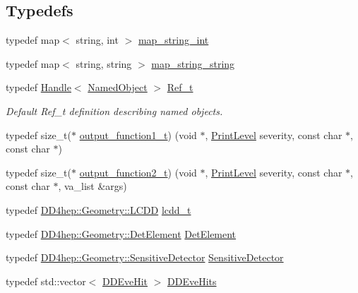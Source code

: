 \subsection*{Typedefs}
\begin{DoxyCompactItemize}
\item 
typedef map$<$ string, int $>$ \hyperlink{namespace_d_d4hep_a5d68f9c863a419d5ed00cc08b473e352}{map\+\_\+string\+\_\+int}
\item 
typedef map$<$ string, string $>$ \hyperlink{namespace_d_d4hep_a0f6ae5793bad82d7e3c5a6fd76334cf1}{map\+\_\+string\+\_\+string}
\item 
typedef \hyperlink{class_d_d4hep_1_1_handle}{Handle}$<$ \hyperlink{class_d_d4hep_1_1_named_object}{Named\+Object} $>$ \hyperlink{group___d_d4_h_e_p___g_e_o_m_e_t_r_y_ga40af83be6718bb8828a3d83dc7f8c930}{Ref\+\_\+t}
\begin{DoxyCompactList}\small\item\em Default Ref\+\_\+t definition describing named objects. \end{DoxyCompactList}\item 
typedef size\+\_\+t($\ast$ \hyperlink{namespace_d_d4hep_ae0b064bdf91daefc2e45293797f6780b}{output\+\_\+function1\+\_\+t}) (void $\ast$, \hyperlink{namespace_d_d4hep_a5b5a64d56252469451f2020a27d57d42}{Print\+Level} severity, const char $\ast$, const char $\ast$)
\item 
typedef size\+\_\+t($\ast$ \hyperlink{namespace_d_d4hep_a932f25438e2e68169d1a82ff99301873}{output\+\_\+function2\+\_\+t}) (void $\ast$, \hyperlink{namespace_d_d4hep_a5b5a64d56252469451f2020a27d57d42}{Print\+Level} severity, const char $\ast$, const char $\ast$, va\+\_\+list \&args)
\item 
typedef \hyperlink{class_d_d4hep_1_1_geometry_1_1_l_c_d_d}{D\+D4hep\+::\+Geometry\+::\+L\+C\+DD} \hyperlink{namespace_d_d4hep_a9d7154801ec259f2a1d2fe015d140518}{lcdd\+\_\+t}
\item 
typedef \hyperlink{class_d_d4hep_1_1_geometry_1_1_det_element}{D\+D4hep\+::\+Geometry\+::\+Det\+Element} \hyperlink{namespace_d_d4hep_a21dd977310ff183f61ca6ae14b59a989}{Det\+Element}
\item 
typedef \hyperlink{class_d_d4hep_1_1_geometry_1_1_sensitive_detector}{D\+D4hep\+::\+Geometry\+::\+Sensitive\+Detector} \hyperlink{namespace_d_d4hep_ae77e9f3818be8d649b030c537e235efe}{Sensitive\+Detector}
\item 
typedef std\+::vector$<$ \hyperlink{class_d_d4hep_1_1_d_d_eve_hit}{D\+D\+Eve\+Hit} $>$ \hyperlink{namespace_d_d4hep_a5e3dc9e6071a76b39c0274507645600c}{D\+D\+Eve\+Hits}

\end{DoxyCompactItemize}
